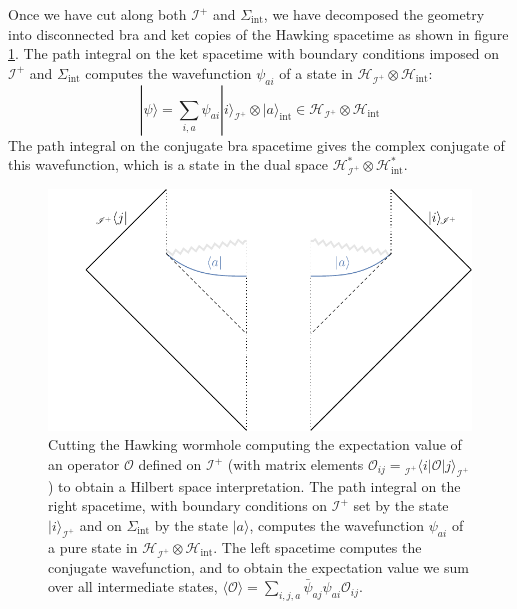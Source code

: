\documentclass[letterpaper,12pt]{article}
\newcommand*{\hilb}{\mathcal{H}}	%
\newcommand*{\scri}{\mathscr{I}} %
\begin{document}
Once we have cut along both $\scri^+$ and $\Sigma_\mathrm{int}$, we have decomposed the geometry into disconnected bra and ket copies of the Hawking spacetime as shown in figure \ref{fig:HawkingHS}. The path integral on the ket spacetime with boundary conditions imposed on $\scri^+$ and $\Sigma_\mathrm{int}$ computes the wavefunction $\psi_{a i}$ of a state in $\hilb_{\scri^+}\otimes \hilb_\mathrm{int}$:
\begin{equation}
	|\psi\rangle = \sum_{i,a} \psi_{a i}  |i\rangle_{\scri^+} \otimes |a \rangle_\mathrm{int} \in \hilb_{\scri^+}\otimes \hilb_\mathrm{int}
\end{equation}
The path integral on the conjugate bra spacetime gives the complex conjugate of this wavefunction, which is a state in the dual space $\hilb_{\scri^+}^*\otimes \hilb_\mathrm{int}^*$.

\begin{figure}
	\centering
	\quad
	\includegraphics[width=.45\textwidth]{HawkingHS.pdf}
	\quad
		\caption{Cutting the Hawking wormhole computing the expectation value of an operator $\mathcal{O}$ defined on $\scri^+$ (with matrix elements $\mathcal{O}_{ij}={}_{\scri^+}\langle i|\mathcal{O}|j\rangle_{\scri^+}$) to obtain a Hilbert space interpretation. The path integral on the right spacetime, with boundary conditions on $\scri^+$ set by the state $|i\rangle_{\scri^+}$ and on $\Sigma_\mathrm{int}$ by the state $|a\rangle$, computes the wavefunction $\psi_{ai}$ of a pure state in $\hilb_{\scri^+}\otimes \hilb_\mathrm{int}$. The left spacetime computes the conjugate wavefunction, and to obtain the expectation value we sum over all intermediate states, $\langle\mathcal{O}\rangle = \sum_{i,j,a}\bar{\psi}_{aj}\psi_{ai}\mathcal{O}_{ij}$. \label{fig:HawkingHS}}
\end{figure}
\end{document}
